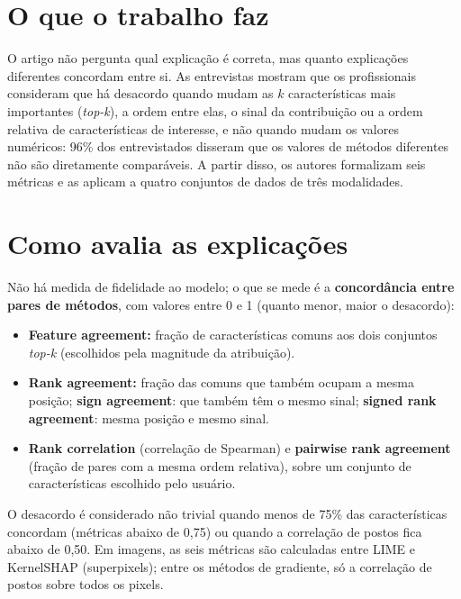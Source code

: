 \documentclass[11pt,a4paper]{article}
\begin{document}
\section{O que o trabalho faz}
O artigo não pergunta qual explicação é correta, mas quanto explicações diferentes concordam entre si. As entrevistas mostram que os profissionais consideram que há desacordo quando mudam as $k$ características mais importantes (\textit{top-k}), a ordem entre elas, o sinal da contribuição ou a ordem relativa de características de interesse, e não quando mudam os valores numéricos: 96\% dos entrevistados disseram que os valores de métodos diferentes não são diretamente comparáveis. A partir disso, os autores formalizam seis métricas e as aplicam a quatro conjuntos de dados de três modalidades.

\section{Como avalia as explicações}
Não há medida de fidelidade ao modelo; o que se mede é a \textbf{concordância entre pares de métodos}, com valores entre 0 e 1 (quanto menor, maior o desacordo):
\begin{itemize}
  \item \textbf{Feature agreement:} fração de características comuns aos dois conjuntos \textit{top-k} (escolhidos pela magnitude da atribuição).
  \item \textbf{Rank agreement:} fração das comuns que também ocupam a mesma posição; \textbf{sign agreement}: que também têm o mesmo sinal; \textbf{signed rank agreement}: mesma posição e mesmo sinal.
  \item \textbf{Rank correlation} (correlação de Spearman) e \textbf{pairwise rank agreement} (fração de pares com a mesma ordem relativa), sobre um conjunto de características escolhido pelo usuário.
\end{itemize}
O desacordo é considerado não trivial quando menos de 75\% das características concordam (métricas abaixo de 0,75) ou quando a correlação de postos fica abaixo de 0,50. Em imagens, as seis métricas são calculadas entre LIME e KernelSHAP (superpixels); entre os métodos de gradiente, só a correlação de postos sobre todos os pixels.
\end{document}
